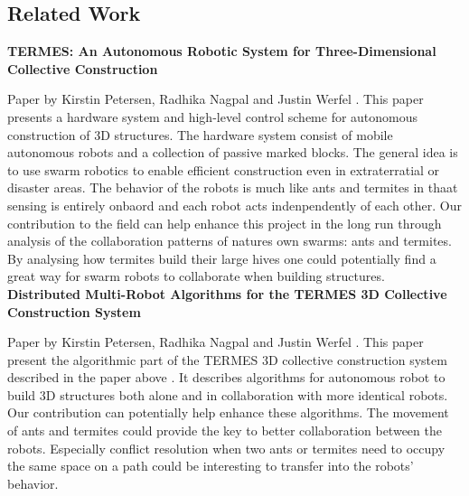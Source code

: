 
\subsection{Related Work}

\noindent \textbf{TERMES: An Autonomous Robotic System for Three-Dimensional Collective Construction} \par

Paper by Kirstin Petersen, Radhika Nagpal and Justin Werfel \cite{termes1}. This paper presents a hardware system and high-level control scheme for autonomous construction of 3D structures. The hardware system consist of mobile autonomous robots and a collection of passive marked blocks. The general idea is to use swarm robotics to enable efficient construction even in extraterratial or disaster areas. The behavior of the robots is much like ants and termites in thaat sensing is entirely onbaord and each robot acts indenpendently of each other. Our contribution to the field can help enhance this project in the long run through analysis of the collaboration patterns of natures own swarms: ants and termites. By analysing how termites build their large hives one could potentially find a great way for swarm robots to collaborate when building structures. \\

\noindent \textbf{Distributed Multi-Robot Algorithms for the TERMES 3D Collective Construction System } \par

Paper by Kirstin Petersen, Radhika Nagpal and Justin Werfel \cite{termes2}. This paper present the algorithmic part of the TERMES 3D collective construction system described in the paper above \cite{termes1}. It describes algorithms for autonomous robot to build 3D structures both alone and in collaboration with more identical robots. Our contribution can potentially help enhance these algorithms. The movement of ants and termites could provide the key to better collaboration between the robots. Especially conflict resolution when two ants or termites need to occupy the same space on a path could be interesting to transfer into the robots' behavior.
